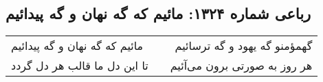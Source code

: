 \begin{center}
\section*{رباعی شماره ۱۳۲۴: مائیم که گه نهان و گه پیدائیم}
\label{sec:1324}
\begin{longtable}{l p{0.5cm} r}
مائیم که گه نهان و گه پیدائیم
&&
گهمؤمنو گه یهود و گه ترسائیم
\\
تا این دل ما قالب هر دل گردد
&&
هر روز به صورتی برون می‌آئیم
\\
\end{longtable}
\end{center}
